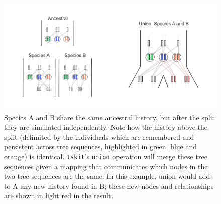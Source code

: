 \documentclass[12pt]{article}
\newcommand{\tskit}[0]{\texttt{tskit}\xspace}
\begin{document}
\begin{figure}[h!]
    \centering
     \includegraphics[width=\textwidth]{figures/union.pdf}
     \caption{
         Species A and B share the same ancestral history, but after the split they are simulated independently. Note how the history above the split (delimited by the individuals which are remembered and persistent across tree sequences, highlighted in green, blue and orange) is identical.
     \tskit's \texttt{union} operation will merge these tree sequences given a mapping that communicates which nodes in the two tree sequences are the same.
     In this example, union would add to A any new history found in B;
     these new nodes and relationships are shown in light red in the result.
     \label{fig:union}
     }
    \end{figure}
\end{document}
